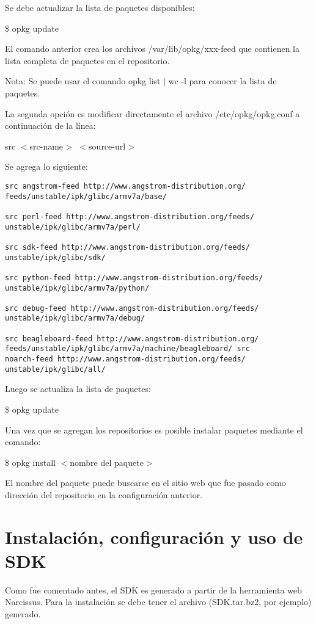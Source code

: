 \bigskip
Se debe actualizar la lista de paquetes disponibles:

\bigskip
\centerline{\$ opkg update}

\bigskip
El comando anterior crea los archivos /var/lib/opkg/xxx-feed que contienen la lista completa de paquetes en el repositorio. 

\bigskip
Nota: Se puede usar el comando opkg list $|$ wc -l para conocer la lista de paquetes. 

\bigskip
La segunda opción es modificar directamente el archivo /etc/opkg/opkg.conf a continuación de la línea: 

\bigskip
src $<$src-name$>$ $<$source-url$>$

\bigskip
Se agrega lo siguiente: 

\begin{verbatim}
src angstrom-feed http://www.angstrom-distribution.org/
feeds/unstable/ipk/glibc/armv7a/base/ 

src perl-feed http://www.angstrom-distribution.org/feeds/
unstable/ipk/glibc/armv7a/perl/ 

src sdk-feed http://www.angstrom-distribution.org/feeds/
unstable/ipk/glibc/sdk/ 

src python-feed http://www.angstrom-distribution.org/feeds/
unstable/ipk/glibc/armv7a/python/ 

src debug-feed http://www.angstrom-distribution.org/feeds/
unstable/ipk/glibc/armv7a/debug/ 

src beagleboard-feed http://www.angstrom-distribution.org/
feeds/unstable/ipk/glibc/armv7a/machine/beagleboard/ src 
noarch-feed http://www.angstrom-distribution.org/feeds/
unstable/ipk/glibc/all/ 
\end{verbatim}

Luego se actualiza la lista de paquetes:

\centerline{\$ opkg update}

\bigskip
Una vez que se agregan los repositorios es posible instalar paquetes mediante el comando: 

\bigskip
\centerline{\$ opkg install $<$nombre del paquete$>$}

\bigskip
El nombre del paquete puede buscarse en el sitio web que fue pasado como dirección del repositorio en la configuración anterior.


\section{Instalación, configuración y uso de SDK}\label{anx_sw_SDK}
Como fue comentado antes, el SDK es generado a partir de la herramienta web Narcissus. Para la instalación se debe tener el archivo (SDK.tar.bz2, por ejemplo) generado.

